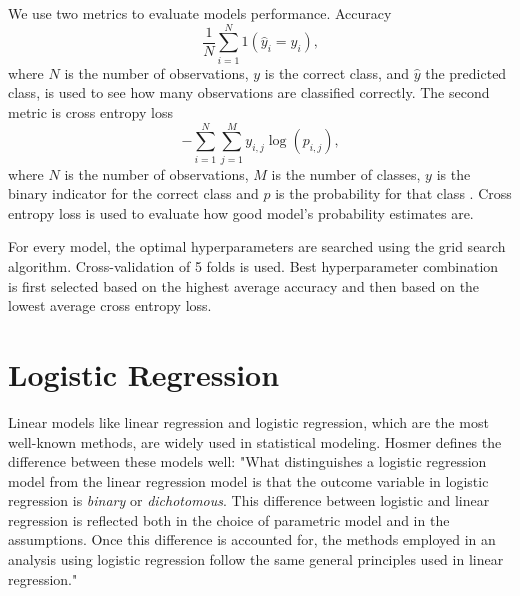 We use two metrics to evaluate models performance. Accuracy
\begin{equation}
    \frac { 1 } { N} \sum _ { i = 1 } ^ {N} 1 \left( \hat { y } _ { i } = y _ { i } \right)\text{,}
\end{equation}
where $N$ is the number of observations, $y$ is the correct class, and $\hat { y }$ the predicted class, is used to see how many observations are classified correctly. The second metric is cross entropy loss
\begin{equation}
    - \sum _ { i = 1 } ^ { N }\sum _ { j = 1 } ^ { M } y _ { i,j } \log \left( p _ { i,j } \right) \text{,}
\end{equation}
where $N$ is the number of observations, $M$ is the number of classes, $y$ is the binary indicator for the correct class and $p$ is the probability for that class \cite{nasrabadi2007pattern}. Cross entropy loss is used to evaluate how good model's probability estimates are.

For every model, the optimal hyperparameters are searched using the grid search algorithm. Cross-validation of 5 folds is used. Best hyperparameter combination is first selected based on the highest average accuracy and then based on the lowest average cross entropy loss.

\section{Logistic Regression}
Linear models like linear regression and logistic regression, which are the most well-known methods, are widely used in statistical modeling. Hosmer \cite{hosmer2013applied} defines the difference between these models well: "What distinguishes a logistic regression model from the linear regression model is that the outcome variable in logistic regression is \textit{binary} or \textit{dichotomous}. This difference between logistic and linear regression is reflected both in the choice of parametric model and in the assumptions. Once this difference is accounted for, the methods employed in an analysis using logistic regression follow the same general principles used in linear regression."

